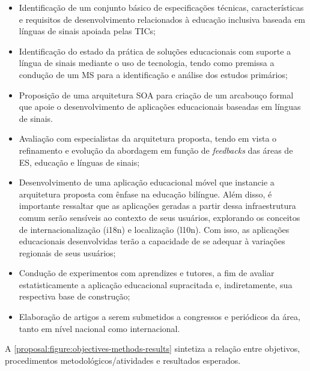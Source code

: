 \begin{itemize}
  \item Identificação de um conjunto básico de especificações técnicas, características e requisitos de desenvolvimento relacionados à educação inclusiva baseada em línguas de sinais apoiada pelas TICs;
  
  \item Identificação do estado da prática de soluções educacionais com suporte a língua de sinais mediante o uso de tecnologia, tendo como premissa a condução de um MS para a identificação e análise dos estudos primários;
  
  \item Proposição de uma arquitetura SOA para criação de um arcabouço formal que apoie o desenvolvimento de aplicações educacionais baseadas em línguas de sinais. %
  
  \item Avaliação com especialistas da arquitetura proposta, tendo em vista o refinamento e evolução da abordagem em função de \textit{feedbacks} das áreas de ES, educação e línguas de sinais;
  
  \item Desenvolvimento de uma aplicação educacional móvel que instancie a arquitetura proposta com ênfase na educação bilíngue. Além disso, é importante ressaltar que as aplicações geradas a partir dessa infraestrutura comum serão sensíveis ao contexto de seus usuários, explorando os conceitos de internacionalização (i18n) e localização (l10n). Com isso, as aplicações educacionais desenvolvidas terão a capacidade de se adequar à variações regionais de seus usuários;
  
  \item Condução de experimentos com aprendizes e tutores, a fim de avaliar estatisticamente a aplicação educacional supracitada e, indiretamente, sua respectiva base de construção;
  
  \item Elaboração de artigos a serem submetidos a congressos e periódicos da área, tanto em nível nacional como internacional.
\end{itemize}

A \autoref{proposal:figure:objectives-methods-results} sintetiza a relação entre objetivos, procedimentos metodológicos/atividades e resultados esperados.

